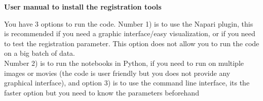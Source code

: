 \documentclass[11pt]{article}
\begin{document}
\begin{center}
\large
\textbf{User manual to install the registration tools}

\vspace{0.2cm}
\end{center}

You have 3 options to run the code. Number 1) is to use the Napari plugin, this is recommended if you need a graphic interface/easy visualization, or if you need to test the registration parameter. This option does not allow you to run the code on a big batch of data. \\
Number 2) is to run the notebooks in Python, if you need to run on multiple images or movies (the code is user friendly but you does not provide any graphical interface), and option 3) is to use the command line interface, its the faster option but you need to know the parameters beforehand
\end{document}
